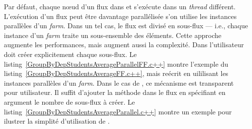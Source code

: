 Par d\'efaut, chaque nœud d'un flux dans  et  s'ex\'ecute dans un \emph{thread} diff\'erent. L'ex\'ecution d'un flux peut \^etre davantage parall\'elis\'ee s'on utilise les instances parall\`eles d'un \emph{farm}. Dans un tel cas, le flux est divis\'e en sous-flux — i.e., chaque instance d'un \emph{farm} traite un sous-ensemble des \'el\'ements. Cette approche augmente les performances, mais augment aussi la complexit\'e. Dans  l'utilisateur doit cr\'eer explicitement chaque sous-flux. Le listing~\ref{GroupByDepStudentsAverageParallelFF.c++} montre l'exemple du listing~\ref{GroupByDepStudentsAverageFF.c++}, mais re\'ecrit en uililisant les instances parall\`eles d'un \emph{farm}. Dans le cas de , ce m\'ecanisme est transparent pour utilisateur. Il suffit d'ajouter la m\'ethode  dans le flux en sp\'ecifiant en argument le nombre de sous-flux \`a cr\'eer. Le listing~\ref{GroupByDepStudentsAverageParallel.c++} montre un exemple pour ilustrer la simplit\'e d'utilisation de .




